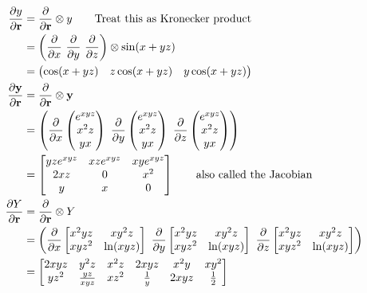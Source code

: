 \begin{align*}
    \frac{\partial y}{\partial \textbf{r}} &= \frac{\partial}{\partial \textbf{r}}  \otimes y \tag*{Treat this as Kronecker product} \\
    &= \left(\frac{\partial}{\partial x} \ \frac{\partial}{\partial y} \ \frac{\partial}{\partial z}\right) \otimes \sin(x + yz) \\
    &= \begin{pmatrix}
        \cos(x + yz) & z\cos(x + yz) & y\cos(x + yz)
    \end{pmatrix} \\
    \frac{\partial \textbf{y}}{\partial \textbf{r}} &= \frac{\partial}{\partial \textbf{r}} \otimes \textbf{y} \\
    &= \left(\frac{\partial}{\partial x} \begin{pmatrix}
        e^{xyz} \\ x^2z \\ yx
    \end{pmatrix} \ \frac{\partial}{\partial y} \begin{pmatrix}
        e^{xyz} \\ x^2z \\ yx
    \end{pmatrix} \ \frac{\partial}{\partial z} \begin{pmatrix}
        e^{xyz} \\ x^2z \\ yx
    \end{pmatrix}\right) \\
    &= \begin{bmatrix}
        yze^{xyz} & xze^{xyz} & xye^{xyz} \\
        2xz & 0 & x^2 \\
        y & x & 0
    \end{bmatrix} \tag*{also called the Jacobian} \\
    \frac{\partial Y}{\partial \textbf{r}} &= \frac{\partial}{\partial \textbf{r}} \otimes Y \\
    &= \left(\frac{\partial}{\partial x} \begin{bmatrix}
        x^2yz & xy^2z \\
        xyz^2 & \ln(xyz)
    \end{bmatrix} \ \frac{\partial}{\partial y} \begin{bmatrix}
        x^2yz & xy^2z \\
        xyz^2 & \ln(xyz)
    \end{bmatrix} \ \frac{\partial}{\partial z} \begin{bmatrix}
        x^2yz & xy^2z \\
        xyz^2 & \ln(xyz)
    \end{bmatrix}\right) \\
    &= \begin{bmatrix}
        2xyz & y^2z & x^2z & 2xyz & x^2y & xy^2 \\
        yz^2 & \frac{yz}{xyz} & xz^2 & \frac{1}{y} & 2xyz & \frac{1}{2}
    \end{bmatrix}
\end{align*}
